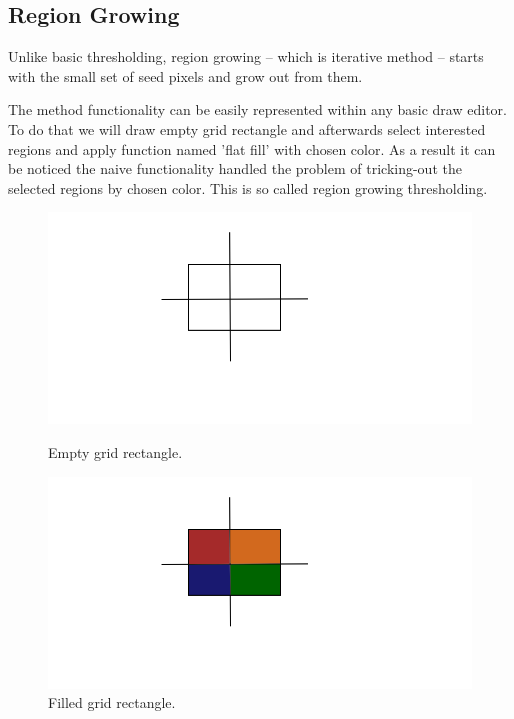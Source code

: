 \subsection{Region Growing}
Unlike basic thresholding, region growing -- which is iterative method -- starts with the small set of seed pixels and grow out from them.

The method functionality can be easily represented within any basic draw editor. To do that we will draw empty grid rectangle and afterwards select interested regions and apply function named 'flat fill' with chosen color. As a result it can be noticed the naive functionality handled the problem of tricking-out the selected regions by chosen color. This is so called region growing thresholding.    

\begin{figure}[h]
    \centering
    \begin{minipage}[b]{0.4\textwidth}
    \includegraphics[width=\textwidth]{images/grow_region_0.png}
    \caption{Empty grid rectangle.}
    \end{minipage}
    \hfill
    \begin{minipage}[b]{0.4\textwidth}
    \includegraphics[width=\textwidth]{images/grow_region_1.png}
    \caption{Filled grid rectangle.}
    \end{minipage}
\end{figure}

